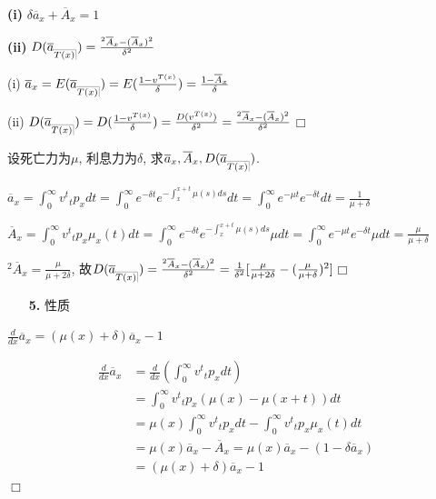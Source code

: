 \documentclass[a4paper,10pt]{ctexbook}
\makeatletter
\newcommand{\hei}{\CJKfamily{hei}}      %
\def\qed{\hfill$\Box$\medskip}
\DeclareRobustCommand{\annu}[1]{_{%
    \def\arraystretch{0}%
    \setlength\arraycolsep{1pt}%
    \setlength\arrayrulewidth{.2pt}%
    \begin{array}[b]{@{}c|}\hline
        \\[\arraycolsep]%
        \scriptstyle #1%
    \end{array}%
}}
\makeatother
\begin{document}
{\rm\bf(i)} $\delta \overline{a}_x + \overline{A}_x = 1$

{\rm\bf(ii)} $D(\overline{a}_{\annu{T(x)}}) = \frac{{}^2\overline{A}_x - (\overline{A}_x)^2}{\delta^2}$

\proof (i) $\overline{a}_x = E(\overline{a}_{\annu{T(x)}}) = E(\frac{1-v^{T(x)}}{\delta}) = \frac{1-\overline{A}_x}{\delta}$

(ii) $D(\overline{a}_{\annu{T(x)}}) = D(\frac{1-v^{T(x)}}{\delta}) = \frac{D(v^{T(x)})}{\delta^2} = \frac{{}^2\overline{A}_x - (\overline{A}_x)^2}{\delta^2}$\qed

\begin{example}
    设死亡力为$\mu$, 利息力为$\delta$, 求$\overline{a}_x, \overline{A}_x, D(\overline{a}_{\annu{T(x)}})$.
\end{example}
\solution $\overline{a}_x = \int_0^{\infty} v^t {}_tp_xdt = \int_0^{\infty} e^{-\delta t}e^{-\int_{x}^{x+t}\mu(s)ds}dt = \int_0^{\infty} e^{-\mu t}e^{-\delta t}dt = \frac{1}{\mu+\delta}$

$\overline{A}_x = \int_0^{\infty} v^t {}_tp_x\mu_x(t)dt = \int_0^{\infty} e^{-\delta t}e^{-\int_{x}^{x+t}\mu(s)ds}\mu dt = \int_0^{\infty} e^{-\mu t}e^{-\delta t}\mu dt = \frac{\mu}{\mu+\delta}$

${}^2\overline{A}_x = \frac{\mu}{\mu+2\delta}$, 故$D(\overline{a}_{\annu{T(x)}}) = \frac{{}^2\overline{A}_x - (\overline{A}_x)^2}{\delta^2} = \frac{1}{\delta^2}[\frac{\mu}{\mu+2\delta} - (\frac{\mu}{\mu+\delta})^2]$\qed

\begin{itemize}
    \item[{\bf\hei 5.}]性质
\end{itemize}

$\frac{d}{dx}\overline{a}_x = (\mu(x)+\delta)\overline{a}_x-1$

\proof
\begin{align*}
    \frac{d}{dx}\overline{a}_x
     & = \frac{d}{dx}(\int_0^{\infty} v^t{}_tp_x dt)                                              \\
     & = \int_0^{\infty} v^t{}_tp_x(\mu(x) - \mu(x+t)) dt                                         \\
     & = \mu(x)\int_0^{\infty} v^t{}_tp_x dt - \int_0^{\infty} v^t{}_tp_x\mu_x(t) dt              \\
     & = \mu(x)\overline{a}_x - \overline{A}_x  = \mu(x)\overline{a}_x - (1-\delta\overline{a}_x) \\
     & = (\mu(x)+\delta)\overline{a}_x-1
\end{align*}
\qed
\end{document}
